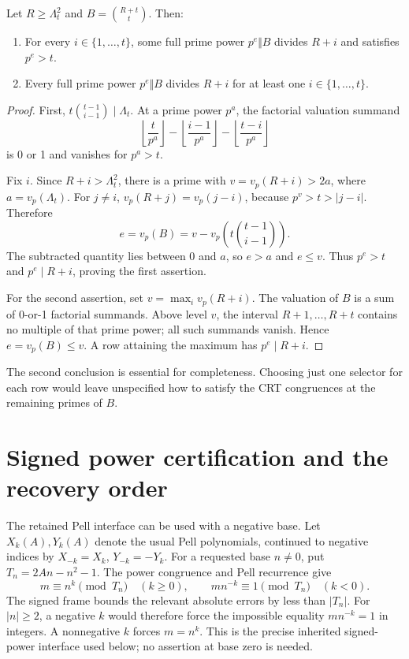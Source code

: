 \begin{lemma}\label{lem:coverage}
Let $R\ge\Lambda_t^2$ and $B=\binom{R+t}{t}$. Then:
\begin{enumerate}
\item For every $i\in\{1,\ldots,t\}$, some full prime power
      $p^e\Vert B$ divides $R+i$ and satisfies $p^e>t$.
\item Every full prime power $p^e\Vert B$ divides $R+i$ for at least
      one $i\in\{1,\ldots,t\}$.
\end{enumerate}
\end{lemma}
\begin{proof}
First, $t\binom{t-1}{i-1}\mid\Lambda_t$. At a prime power $p^a$, the
factorial valuation summand
\[
 \left\lfloor\frac{t}{p^a}\right\rfloor
 -\left\lfloor\frac{i-1}{p^a}\right\rfloor
 -\left\lfloor\frac{t-i}{p^a}\right\rfloor
\]
is 0 or 1 and vanishes for $p^a>t$.

Fix $i$. Since $R+i>\Lambda_t^2$, there is a prime with
$v=v_p(R+i)>2a$, where $a=v_p(\Lambda_t)$. For $j\ne i$,
$v_p(R+j)=v_p(j-i)$, because $p^v>t>|j-i|$.
Therefore
\[
 e=v_p(B)=v-v_p\!\left(t\binom{t-1}{i-1}\right).
\]
The subtracted quantity lies between 0 and $a$, so $e>a$ and $e\le v$.
Thus $p^e>t$ and $p^e\mid R+i$, proving the first assertion.

For the second assertion, set $v=\max_i v_p(R+i)$. The valuation of
$B$ is a sum of 0-or-1 factorial summands. Above level $v$, the interval
$R+1,\ldots,R+t$ contains no multiple of that prime power; all such
summands vanish. Hence $e=v_p(B)\le v$. A row attaining the maximum
has $p^e\mid R+i$.
\end{proof}

The second conclusion is essential for completeness. Choosing just one
selector for each row would leave unspecified how to satisfy the CRT
congruences at the remaining primes of $B$.

\section{Signed power certification and the recovery order}\label{sec:bootstrap}

The retained Pell interface can be used with a negative base. Let
$X_k(A),Y_k(A)$ denote the usual Pell polynomials, continued to negative
indices by $X_{-k}=X_k$, $Y_{-k}=-Y_k$. For a requested base $n\ne0$,
put $T_n=2An-n^2-1$. The power congruence and Pell recurrence give
\[
 m\equiv n^k\pmod{T_n}\quad(k\ge0),\qquad
 mn^{-k}\equiv1\pmod{T_n}\quad(k<0).
\]
The signed frame bounds the relevant absolute errors by less than
$|T_n|$. For $|n|\ge2$, a negative $k$ would therefore force the
impossible equality $mn^{-k}=1$ in integers. A nonnegative $k$ forces
$m=n^k$. This is the precise inherited signed-power interface used below;
no assertion at base zero is needed.

